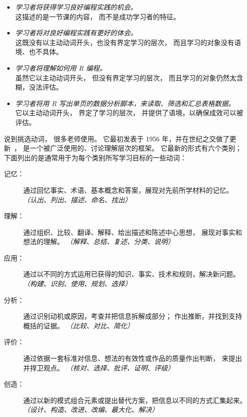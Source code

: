 \begin{itemize}

\item
  \emph{学习者将获得学习良好编程实践的机会。}\\
  这描述的是一节课的内容，
  而不是成功学习者的特征。\\

\item
  \emph{学习者将对良好编程实践有更好的体会。}\\
  这既没有以主动动词开头，也没有界定学习的层次，
  而且学习的对象没有语境、也不具体。\\

\item
  \emph{学习者将理解如何用 R 编程。}\\
  虽然它以主动动词开头，
  但没有界定学习的层次，
  而且学习的对象仍然太含糊，没法评估。\\

\item
  \emph{学习者将用 R 写出单页的数据分析脚本，来读取、筛选和汇总表格数据。}\\
  它以主动动词开头，
  界定了学习的层次，
  并提供了语境，以确保成效可以被评估。

\end{itemize}

说到挑选动词，
很多老师使用。
它最初发表于 1956 年，并在世纪之交做了更新~\cite{Ande2001}，
是一个被广泛使用的、讨论理解层次的框架。
它最新的形式有六个类别；
下面列出的是通常用于为每个类别所写学习目标的一些动词：

\begin{description}

\item[记忆：]
  通过回忆事实、术语、基本概念和答案，展现对先前所学材料的记忆。
  \emph{（认出、列出、描述、命名、找出）}

\item[理解：]
  通过组织、比较、翻译、解释、给出描述和陈述中心思想，
  展现对事实和想法的理解。
  \emph{（解释、总结、复述、分类、说明）}

\item[应用：]
  通过以不同的方式运用已获得的知识、事实、技术和规则，解决新问题。
  \emph{（构建、识别、使用、规划、选择）}

\item[分析：]
  通过识别动机或原因，考查并把信息拆解成部分；
  作出推断，并找到支持概括的证据。
  \emph{（比较、对比、简化）}

\item[评价：]
  通过依据一套标准对信息、想法的有效性或作品的质量作出判断，
  来提出并捍卫观点。
  \emph{（核对、选择、批评、证明、评级）}

\item[创造：]
  通过以新的模式组合元素或提出替代方案，把信息以不同的方式汇集起来。
  \emph{（设计、构造、改进、改编、最大化、解决）}

\end{description}

